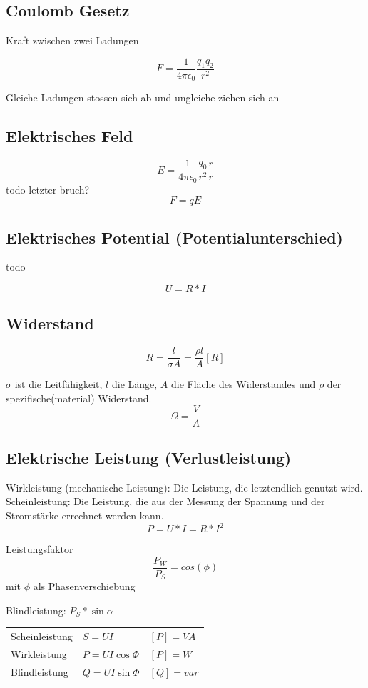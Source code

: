 \subsection{Coulomb Gesetz}
Kraft zwischen zwei Ladungen 

$$ F=\frac{1}{4\pi\epsilon_{0}}\frac{q_{1}q_{2}}{r^2} $$

Gleiche Ladungen stossen sich ab und ungleiche ziehen sich an

\subsection{Elektrisches Feld}

$$ E =\frac{1}{4\pi\epsilon_{0}}\frac{q_{0}}{r^2}\frac{r}{r} $$ todo letzter bruch?
$$ F = qE $$

\subsection{Elektrisches Potential (Potentialunterschied)}

todo

$$ U = R*I $$

\subsection{Widerstand}


$$ R = \frac{l}{\sigma A} = \frac{\rho l}{A} [R]$$

$\sigma$ ist die Leitfähigkeit, $l$ die Länge, $A$ die Fläche des Widerstandes und $\rho$ der spezifische(material) Widerstand.\\
$$\Omega = \frac{V}{A}$$

\subsection{Elektrische Leistung (Verlustleistung)}

Wirkleistung (mechanische Leistung): Die Leistung, die letztendlich genutzt wird. \\
Scheinleistung: Die Leistung, die aus der Messung der Spannung und der Stromstärke errechnet werden kann. \\

$$ P = U*I = R * I^2 $$ 


Leistungsfaktor
$$\frac{P_{W}}{P_{S}} = cos(\phi)$$
mit $\phi$ als Phasenverschiebung

Blindleistung: $P_S*\sin\alpha$

\begin{tabular}{|ll|l|}
Scheinleistung & $S = UI$ & $[P] = VA$ \\
Wirkleistung & $P = UI \cos{\Phi}$ & $[P] = W$ \\
Blindleistung & $Q = UI \sin{\Phi}$ & $[Q] = var$
\end{tabular}



